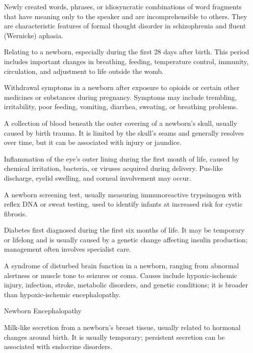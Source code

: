  Newly created words, phrases, or idiosyncratic combinations of word fragments that have meaning only to the speaker and are incomprehensible to others. They are characteristic features of formal thought disorder in schizophrenia and fluent (Wernicke) aphasia.

 Relating to a newborn, especially during the first 28 days after birth. This period includes important changes in breathing, feeding, temperature control, immunity, circulation, and adjustment to life outside the womb.

 Withdrawal symptoms in a newborn after exposure to opioids or certain other medicines or substances during pregnancy. Symptoms may include trembling, irritability, poor feeding, vomiting, diarrhea, sweating, or breathing problems.

 A collection of blood beneath the outer covering of a newborn’s skull, usually caused by birth trauma. It is limited by the skull’s seams and generally resolves over time, but it can be associated with injury or jaundice.

 Inflammation of the eye’s outer lining during the first month of life, caused by chemical irritation, bacteria, or viruses acquired during delivery. Pus-like discharge, eyelid swelling, and corneal involvement may occur.

 A newborn screening test, usually measuring immunoreactive trypsinogen with reflex DNA or sweat testing, used to identify infants at increased risk for cystic fibrosis.

 Diabetes first diagnosed during the first six months of life. It may be temporary or lifelong and is usually caused by a genetic change affecting insulin production; management often involves specialist care.

 A syndrome of disturbed brain function in a newborn, ranging from abnormal alertness or muscle tone to seizures or coma. Causes include hypoxic-ischemic injury, infection, stroke, metabolic disorders, and genetic conditions; it is broader than hypoxic-ischemic encephalopathy.

\synonyms
Newborn Encephalopathy

 Milk-like secretion from a newborn's breast tissue, usually related to hormonal changes around birth. It is usually temporary; persistent secretion can be associated with endocrine disorders.

